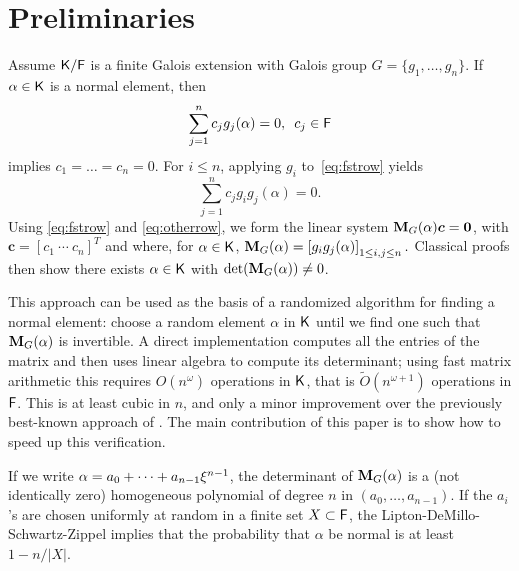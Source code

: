 \section{Preliminaries}
\label{sec:pre}

Assume ${\mathsf{K}}/{\mathsf{F}}$ is a finite Galois
extension with Galois group $G = \lbrace g_1 , \ldots , g_n \rbrace$. If
$\alpha \in {\mathsf{K}}$ is a normal element, then
\begin{equation}
  \label{eq:fstrow}
  \sum_{j=1}^n 
  c_j g_j(\alpha)=0, \,\,\, c_j \in {\mathsf{F}} 
\end{equation} 
implies $c_1 =\dots=c_n = 0$. For 
$i \le n$, applying $g_i$ to~\eqref{eq:fstrow} yields
\begin{equation} \label{eq:otherrow} \sum_{j=1}^n c_j g_i g_j(\alpha)=0.
\end{equation}
Using \eqref{eq:fstrow} and \eqref{eq:otherrow}, we form the linear
system $\mat{M}_G(\alpha)\boldsymbol{c} = \textbf{0}$,
with $\boldsymbol{c} = [ c_1~ \cdots~c_n]^T$ and
 where, for $\alpha\in{\mathsf{K}}$, $\mat M_G(\alpha) =\left[g_ig_j(\alpha)\right]_{1 \leq i,j \leq n}.$
Classical proofs then show there exists $\alpha \in {\mathsf{K}}$
with $\det(\mat M_G(\alpha))\neq 0$.
 
This approach can be used as the basis of a randomized algorithm for
finding a normal element: choose a random element $\alpha$ in ${\mathsf{K}}$ until we
find one such that $ \mat M_G(\alpha)$ is invertible. A direct implementation computes
all the entries of the matrix and then uses linear algebra to compute its
determinant; using fast matrix arithmetic this requires $O(n^\omega)$
operations in ${\mathsf{K}}$, that is $\tilde{O}(n^{\omega+1})$ operations in
${\mathsf{F}}$. This is at least cubic in $n$, and only a minor improvement over the
previously best-known approach of . The main contribution
of this paper is to show how to speed up this verification.
 
If we write $\alpha = a_0 + \cdots + a_{n-1} \xi^{n-1}$, the
determinant of $\mat M_G(\alpha)$ is a (not identically zero)
homogeneous polynomial of degree $n$ in $(a_0,\dots,a_{n-1})$. If the
$a_i$'s are chosen uniformly at random in a finite set $X \subset {\mathsf{F}}$,
the Lipton-DeMillo-Schwartz-Zippel implies that the probability that
$\alpha$ be normal is at least $1-n/|X|$.

